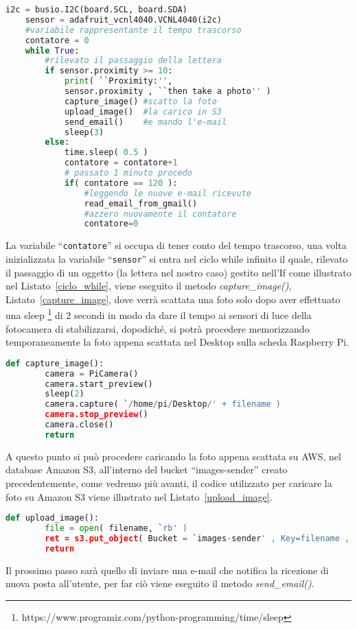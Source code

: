 \begin{lstlisting}[language=Python,frame=single,caption=Codice Python ,captionpos=t,label=ciclo_while]
    i2c = busio.I2C(board.SCL, board.SDA)
    sensor = adafruit_vcnl4040.VCNL4040(i2c)
    #variabile rappresentante il tempo trascorso
    contatore = 0  
    while True:
        #rilevato il passaggio della lettera
        if sensor.proximity >= 10: 
            print( ``Proximity:'', 
            sensor.proximity , ``then take a photo'' )
            capture_image() #scatto la foto
            upload_image()  #la carico in S3
            send_email()    #e mando l'e-mail
            sleep(3)
        else:
            time.sleep( 0.5 )
            contatore = contatore+1
            # passato 1 minuto procedo
            if( contatore == 120 ):
                #leggendo le nuove e-mail ricevute
                read_email_from_gmail()
                #azzero nuovamente il contatore
                contatore=0     
\end{lstlisting}
La variabile ``\texttt{contatore}'' si occupa di tener conto del tempo trascorso, una volta inizializzata la variabile ``\texttt{sensor}'' si entra nel ciclo while 
infinito il quale, rilevato il passaggio di un oggetto (la lettera nel nostro caso) gestito nell'If come illustrato nel Listato~\ref{ciclo_while}, viene eseguito il 
metodo \textit{capture\_image()}, Listato~\ref{capture_image}, dove verrà scattata una foto solo dopo aver effettuato una sleep
\footnote{https://www.programiz.com/python-programming/time/sleep} di 2 secondi in modo da dare il tempo ai sensori di luce della fotocamera di stabilizzarsi, 
dopodiché, si potrà procedere memorizzando temporaneamente la foto appena scattata nel Desktop sulla scheda Raspberry Pi.
\begin{lstlisting}[language=Python,frame=single,caption=Funzione capture\_image,captionpos=t,label=capture_image]
    def capture_image():
        camera = PiCamera()
        camera.start_preview()
        sleep(2)
        camera.capture( `/home/pi/Desktop/' + filename )
        camera.stop_preview()
        camera.close()
        return    
\end{lstlisting}
A questo punto si può procedere caricando la foto appena scattata su AWS, nel database Amazon S3, all'interno del bucket ``images-sender'' creato precedentemente, come vedremo 
più avanti, il codice utilizzato per caricare la foto su Amazon S3 viene illustrato nel Listato~\ref{upload_image}.
\begin{lstlisting}[language=Python,frame=single,caption=Funzione upload\_image code,captionpos=t,label=upload_image]
    def upload_image():
        file = open( filename, `rb' )
        ret = s3.put_object( Bucket = `images-sender' , Key=filename , Body=file )
        return
\end{lstlisting}
Il prossimo passo sarà quello di inviare una e-mail che notifica la ricezione di nuova posta all'utente, per far ciò viene eseguito il metodo \textit{send\_email()}.

